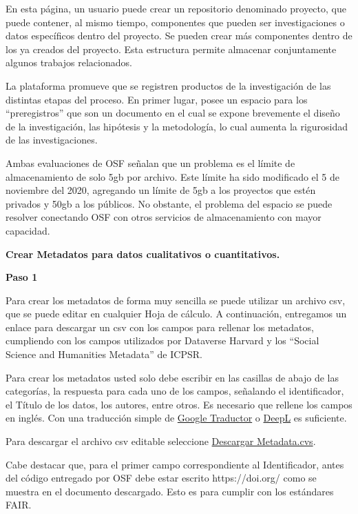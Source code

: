 \documentclass[
  spanish,
  a4paper,
  oneside]{scrbook}
\begin{document}
En esta página, un usuario puede crear un repositorio denominado
proyecto, que puede contener, al mismo tiempo, componentes que pueden
ser investigaciones o datos específicos dentro del proyecto. Se pueden
crear más componentes dentro de los ya creados del proyecto. Esta
estructura permite almacenar conjuntamente algunos trabajos
relacionados.

La plataforma promueve que se registren productos de la investigación de
las distintas etapas del proceso. En primer lugar, posee un espacio para
los ``preregistros'' que son un documento en el cual se expone
brevemente el diseño de la investigación, las hipótesis y la
metodología, lo cual aumenta la rigurosidad de las investigaciones.

Ambas evaluaciones de OSF señalan que un problema es el límite de
almacenamiento de solo 5gb por archivo. Este límite ha sido modificado
el 5 de noviembre del 2020, agregando un límite de 5gb a los proyectos
que estén privados y 50gb a los públicos. No obstante, el problema del
espacio se puede resolver conectando OSF con otros servicios de
almacenamiento con mayor capacidad.

\textbf{Crear Metadatos para datos cualitativos o cuantitativos.}

\textbf{Paso 1}

Para crear los metadatos de forma muy sencilla se puede utilizar un
archivo csv, que se puede editar en cualquier Hoja de cálculo. A
continuación, entregamos un enlace para descargar un csv con los campos
para rellenar los metadatos, cumpliendo con los campos utilizados por
Dataverse Harvard y los ``Social Science and Humanities Metadata'' de
ICPSR.

Para crear los metadatos usted solo debe escribir en las casillas de
abajo de las categorías, la respuesta para cada uno de los campos,
señalando el identificador, el Título de los datos, los autores, entre
otros. Es necesario que rellene los campos en inglés. Con una traducción
simple de \href{https://translate.google.com/}{Google Traductor} o
\href{https://www.deepl.com/es/translator}{DeepL} es suficiente.

Para descargar el archivo csv editable seleccione
\href{https://raw.githubusercontent.com/franciscomeneses/CADIS/master/metadata.csv}{Descargar
Metadata.cvs}.

Cabe destacar que, para el primer campo correspondiente al
Identificador, antes del código entregado por OSF debe estar escrito
https://doi.org/ como se muestra en el documento descargado. Esto es
para cumplir con los estándares FAIR.
\end{document}
